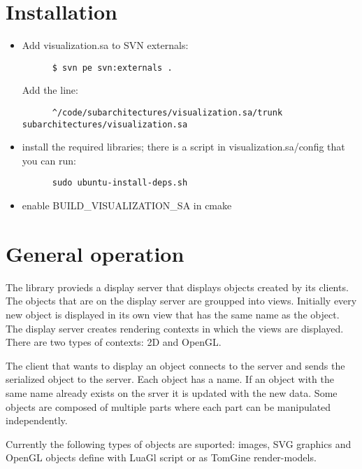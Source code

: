 
\section{Installation}

\begin{itemize}
   \item Add visualization.sa to SVN externals:
   \begin{verbatim}
      $ svn pe svn:externals .
   \end{verbatim}
   Add the line:
   \begin{verbatim}
      ^/code/subarchitectures/visualization.sa/trunk   subarchitectures/visualization.sa
   \end{verbatim}

   \item install the required libraries; there is a script in visualization.sa/config
   that you can run:
   \begin{verbatim}
      sudo ubuntu-install-deps.sh
   \end{verbatim}

   \item enable BUILD\_VISUALIZATION\_SA in cmake
\end{itemize}

\section{General operation}

The library provieds a display server that displays objects created by its
clients.  The objects that are on the display server are groupped into views.
Initially every new object is displayed in its own view that has the same name
as the object.
The display server creates rendering contexts in which the views are displayed.
There are two types of contexts: 2D and OpenGL.

The client that wants to display an object connects to the server and sends the
serialized object to the server. Each object has a name. If an object with the
same name already exists on the srver it is updated with the new data. Some
objects are composed of multiple parts where each part can be manipulated
independently.

Currently the following types of objects are suported: images, SVG graphics and
OpenGL objects define with LuaGl script or as TomGine render-models. 

